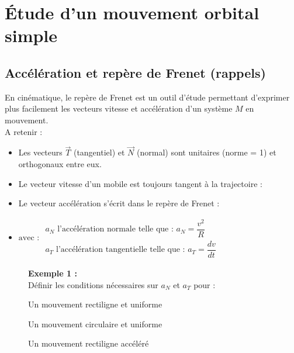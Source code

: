 \documentclass[a4paper,12pt,fleqn]{scrartcl}%
\begin{document}
\maketitle

\section{Étude d'un mouvement orbital simple}
	\subsection{Accélération et repère de Frenet (rappels)}
	\begin{minipage}{.72\linewidth}
	En cinématique, le repère de Frenet est un outil d'étude permettant d'exprimer plus facilement les vecteurs vitesse et accélération d'un système $M$ en mouvement.\\
	A retenir :
	\begin{itemize}
		\item Les vecteurs $\vec{T}$ (tangentiel) et $\vec{N}$ (normal) sont unitaires (norme = 1) et orthogonaux entre eux.
		\item Le vecteur vitesse d'un mobile est toujours tangent à la trajectoire : 
		\item Le vecteur accélération s'écrit dans le repère de Frenet : 
		\item $\text{avec : } \begin{array}{l} 
		a_N \text{ l'accélération normale telle que : } a_N = \dfrac{v^2}{R}\\
		a_T \text{ l'accélération tangentielle telle que : } a_T =\dfrac{dv}{dt}
		\end{array}$
	\end{itemize}
\end{minipage}
\begin{figure}[h!]
	\begin{minipage}{.7\linewidth}
	\begin{tcolorbox}[arc=1ex, colframe=black, left=3pt, right=3pt, top=3pt, bottom=2pt]
	\textbf{Exemple 1 :}\\
	Définir les conditions nécessaires sur $a_N$ et $a_T$ pour :
		\begin{itemize**}
			\item Un mouvement rectiligne et uniforme
			\item Un mouvement circulaire et uniforme
			\item Un mouvement rectiligne accéléré
		\end{itemize**}
	\end{tcolorbox}	
	\end{minipage}
\end{figure}
\end{document}
